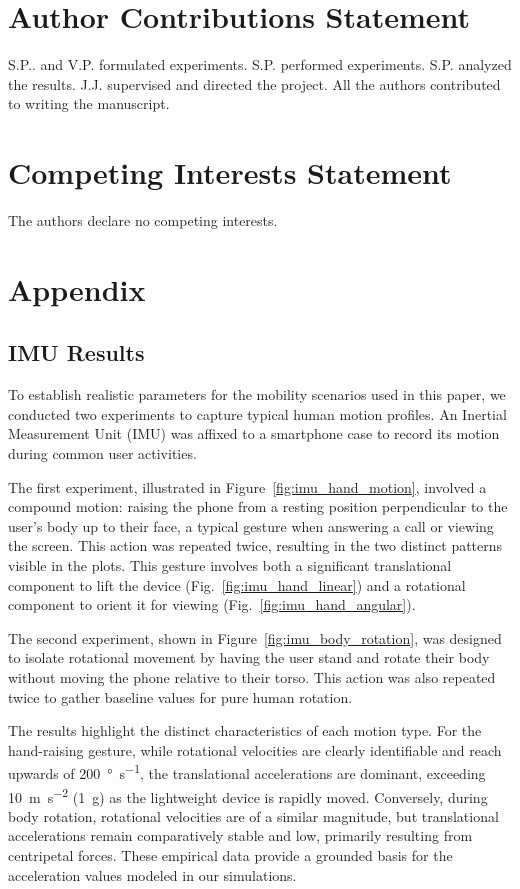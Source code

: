 \documentclass[fleqn,10pt]{wlscirep}
\begin{document}
\section*{Author Contributions Statement}
S.P.. and V.P. formulated experiments. S.P. performed experiments. S.P. analyzed the results. J.J. supervised and directed the project. All the authors contributed to writing the manuscript.


\section*{Competing Interests Statement}
The authors declare no competing interests.

\newpage
\section*{Appendix}
\subsection*{IMU Results}
To establish realistic parameters for the mobility scenarios used in this paper, we conducted two experiments to capture typical human motion profiles. An Inertial Measurement Unit (IMU) was affixed to a smartphone case to record its motion during common user activities.

The first experiment, illustrated in Figure~\ref{fig:imu_hand_motion}, involved a compound motion: raising the phone from a resting position perpendicular to the user's body up to their face, a typical gesture when answering a call or viewing the screen. This action was repeated twice, resulting in the two distinct patterns visible in the plots. This gesture involves both a significant translational component to lift the device (Fig.~\ref{fig:imu_hand_linear}) and a rotational component to orient it for viewing (Fig.~\ref{fig:imu_hand_angular}).

The second experiment, shown in Figure~\ref{fig:imu_body_rotation}, was designed to isolate rotational movement by having the user stand and rotate their body without moving the phone relative to their torso. This action was also repeated twice to gather baseline values for pure human rotation.

The results highlight the distinct characteristics of each motion type. For the hand-raising gesture, while rotational velocities are clearly identifiable and reach upwards of \SI{200}{\degree\per\second}, the translational accelerations are dominant, exceeding \SI{10}{\meter\per\second\squared} (\SI{1}{g}) as the lightweight device is rapidly moved. Conversely, during body rotation, rotational velocities are of a similar magnitude, but translational accelerations remain comparatively stable and low, primarily resulting from centripetal forces. These empirical data provide a grounded basis for the acceleration values modeled in our simulations.
\end{document}

